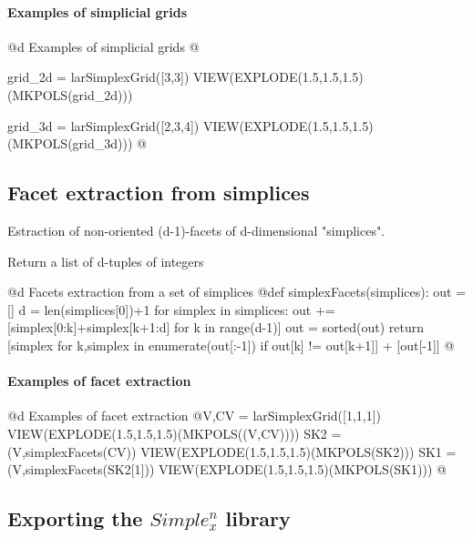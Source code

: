 \documentclass[11pt,oneside]{article}	%
\begin{document}
\paragraph{Examples of simplicial grids}
@d Examples of simplicial grids
@{grid_2d = larSimplexGrid([3,3])
VIEW(EXPLODE(1.5,1.5,1.5)(MKPOLS(grid_2d)))

grid_3d = larSimplexGrid([2,3,4])
VIEW(EXPLODE(1.5,1.5,1.5)(MKPOLS(grid_3d)))
@}



\subsection{Facet extraction from simplices}

Estraction of non-oriented (d-1)-facets of
        d-dimensional "simplices".
        
        Return a list of d-tuples of integers
        
@d Facets extraction from a set of simplices
@{def simplexFacets(simplices):
    out = []
    d = len(simplices[0])+1
    for simplex in simplices:
        out += [simplex[0:k]+simplex[k+1:d] for k in range(d-1)]
    out = sorted(out)
    return [simplex for k,simplex in enumerate(out[:-1])
            if out[k] != out[k+1]] + [out[-1]]
@}

\paragraph{Examples of facet extraction}
@d Examples of facet extraction
@{V,CV = larSimplexGrid([1,1,1])
VIEW(EXPLODE(1.5,1.5,1.5)(MKPOLS((V,CV))))
SK2 = (V,simplexFacets(CV))
VIEW(EXPLODE(1.5,1.5,1.5)(MKPOLS(SK2)))
SK1 = (V,simplexFacets(SK2[1]))
VIEW(EXPLODE(1.5,1.5,1.5)(MKPOLS(SK1)))
@}



\subsection{Exporting the $Simple_x^n$ library}
\end{document}
